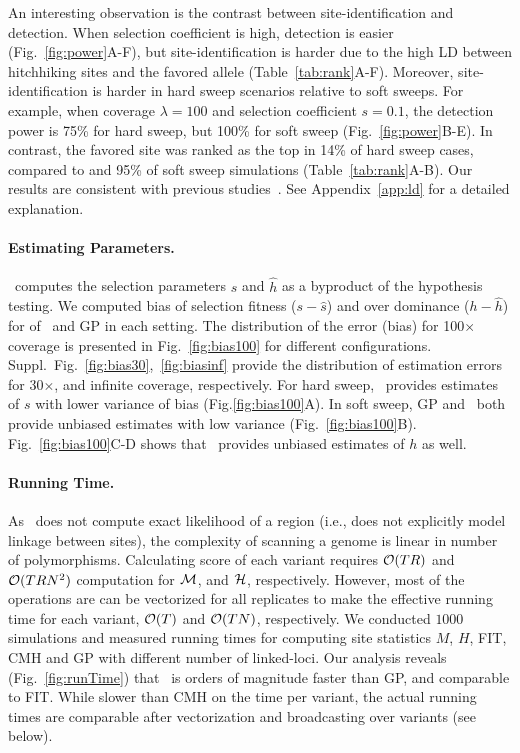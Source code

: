 An interesting observation is the contrast between site-identification
and detection. When selection coefficient is high, detection is easier
(Fig.~\ref{fig:power}A-F), but site-identification is harder due to
the high LD between hitchhiking sites and the favored allele
(Table~\ref{tab:rank}A-F).  Moreover, site-identification is harder in
hard sweep scenarios relative to soft sweeps. For example, when
coverage $\lambda=100$ and selection coefficient $s=0.1$, the
detection power is 75\% for hard sweep, but 100\% for soft sweep
(Fig.~\ref{fig:power}B-E). In contrast, the favored site was ranked as
the top in 14\% of hard sweep cases, compared to and 95\% of soft
sweep simulations (Table~\ref{tab:rank}A-B).  Our results are
consistent with previous
studies~\cite{long2013massive,tobler2014massive}. See 
Appendix~\ref{app:ld} for a detailed explanation.
 
\paragraph{Estimating Parameters.}
\comale\ computes the selection parameters $\hat{s}$ and $\hat{h}$ as
a byproduct of the hypothesis testing. We computed bias of selection
fitness ($s-\hat{s}$) and over dominance ($h-\hat{h}$) for of \comale\
and GP in each setting. The distribution of the error (bias) for
100$\times$ coverage is presented in Fig.~\ref{fig:bias100} for
different configurations.
Suppl.~Fig.~\ref{fig:bias30},~\ref{fig:biasinf} provide the
distribution of estimation errors for 30$\times$, and infinite
coverage, respectively.  For hard sweep, \comale\ provides estimates
of $s$ with lower variance of bias (Fig.\ref{fig:bias100}A). In soft
sweep, GP and \comale\ both provide unbiased estimates with low
variance (Fig.~\ref{fig:bias100}B). Fig.~\ref{fig:bias100}C-D shows
that \comale\ provides unbiased estimates of $h$ as well.

\paragraph{Running Time.}
As \comale\ does not compute exact likelihood of a region (i.e., does
not explicitly model linkage between sites), the complexity of
scanning a genome is linear in number of polymorphisms.  Calculating
score of each variant requires ${\cal O}(TR)$ and ${\cal O}(TRN^2)$ computation
for ${\cal M}$, and ${\cal H}$, respectively. However, most of the operations
are can be vectorized for all replicates to make the effective running
time for each variant, ${\cal O}(T)$ and ${\cal O}(TN)$, respectively.  We
conducted $1000$ simulations and measured running times for computing site 
statistics $M$, $H$, FIT, CMH and GP with different number of linked-loci.  Our
analysis reveals (Fig.~\ref{fig:runTime}) that \comale\ is orders of
magnitude faster than GP, and comparable to FIT. While slower than CMH
on the time per variant, the actual running times are comparable after
vectorization and broadcasting over variants (see below).

